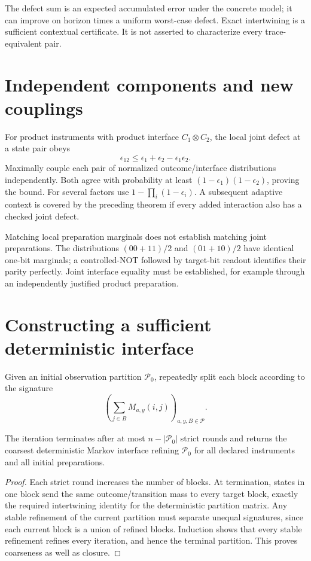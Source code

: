 The defect sum is an expected accumulated error under the concrete model;
it can improve on horizon times a uniform worst-case defect. Exact
intertwining is a sufficient contextual certificate. It is not asserted to
characterize every trace-equivalent pair.

\section{Independent components and new couplings}
For product instruments with product interface $C_1\otimes C_2$, the local
joint defect at a state pair obeys
\[
 \epsilon_{12}\leq\epsilon_1+\epsilon_2-\epsilon_1\epsilon_2.
\]
Maximally couple each pair of normalized outcome/interface distributions
independently. Both agree with probability at least
$(1-\epsilon_1)(1-\epsilon_2)$, proving the bound. For several factors use
$1-\prod_i(1-\epsilon_i)$. A subsequent adaptive context is covered by the
preceding theorem if every added interaction also has a checked joint defect.

Matching local preparation marginals does not establish matching joint
preparations. The distributions $(00+11)/2$ and $(01+10)/2$ have identical
one-bit marginals; a controlled-NOT followed by target-bit readout identifies
their parity perfectly. Joint interface equality must be established,
for example through an independently justified product preparation.

\section{Constructing a sufficient deterministic interface}
Given an initial observation partition $\mathcal P_0$, repeatedly split each
block according to the signature
\[
 \left(\sum_{j\in B}M_{a,y}(i,j)\right)_{a,y,B\in\mathcal P}.
\]
\begin{proposition}
The iteration terminates after at most $n-|\mathcal P_0|$ strict rounds and
returns the coarsest deterministic Markov interface refining $\mathcal P_0$
for all declared instruments and all initial preparations.
\end{proposition}
\begin{proof}
Each strict round increases the number of blocks. At termination, states in
one block send the same outcome/transition mass to every target block, exactly
the required intertwining identity for the deterministic partition matrix.
Any stable refinement of the current partition must separate unequal
signatures, since each current block is a union of refined blocks. Induction
shows that every stable refinement refines every iteration, and hence the
terminal partition. This proves coarseness as well as closure.
\end{proof}

